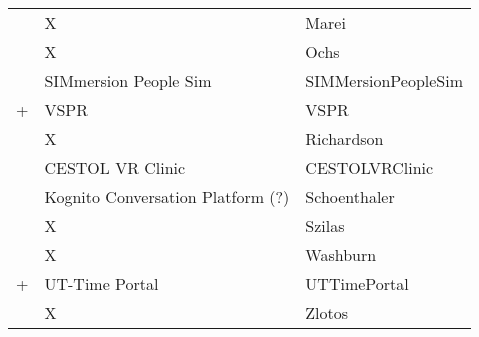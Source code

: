 {\begin{tabularx}{\linewidth} {X | X | X}
\cite{marei2018use} & X & Marei\cite{marei2018use}\\ 

\cite{ochs2019training} & X & Ochs\cite{ochs2019training}\\

\cite{o2019suicide} & SIMmersion People Sim & SIMMersionPeopleSim\cite{o2019suicide}\\ 

\cite{peddle2019exploring} + \cite{peddle2019development} & VSPR & VSPR\cite{peddle2019exploring,peddle2019development}\\ 

\cite{richardson2019virtual} & X & Richardson\cite{richardson2019virtual}\\

\cite{sapkaroski2018implementation} & CESTOL VR Clinic & CESTOLVRClinic\cite{sapkaroski2018implementation}\\ 

\cite{schoenthaler2017simulated} & Kognito Conversation Platform (?) & Schoenthaler\cite{schoenthaler2017simulated}\\ 

\cite{szilas2019virtual} & X & Szilas\cite{szilas2019virtual}\\ 

\cite{washburn2020virtual} & X & Washburn\cite{washburn2020virtual}\\ 

\cite{zielke2016beyond} + \cite{zielke2016using} & UT-Time Portal & UTTimePortal\cite{zielke2016beyond,zielke2016using}\\ 

\cite{zlotos2016scenario} & X & Zlotos\cite{zlotos2016scenario}\\ 

\hline
\end{tabularx}
}

\normalsize



